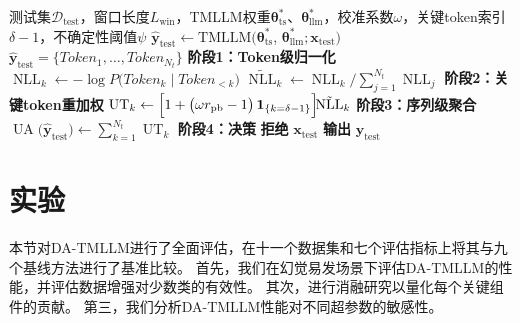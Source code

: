 \documentclass[UTF8,lettersize,journal]{IEEEtran}
\begin{document}
\begin{algorithm}[t]
	\caption{基于关键token驱动不确定性重加权策略的推理流程}
	\label{alg:inference}
	\begin{algorithmic}[1]
		\Require 测试集$\mathcal{D}_\text{test}$，窗口长度$L_{\mathrm{win}}$，TMLLM权重$\bm{\theta}_\mathrm{ts}^*$、$\bm{\theta}_\mathrm{llm}^*$，校准系数$\omega$，关键token索引$\delta-1$，不确定性阈值$\psi$
		\State $\hat{\bm{y}}_\mathrm{test} \gets \mathrm{TMLLM}(\bm{\theta}_\mathrm{ts}^*$, $\bm{\theta}_\mathrm{llm}^*;\bm{x}_\mathrm{test})$
		\State $\hat{\bm{y}}_\mathrm{test}=\{\mathit{Token}_1,\dots,\mathit{Token}_{N_t}\}$
		\Statex \textbf{阶段1：Token级归一化}
		\State $\operatorname{NLL}_k \gets -\!\log P\!\bigl(\mathit{Token}_k \mid \mathit{Token}_{<k}\bigr)$
		\EndFor
		\State $\displaystyle
		\tilde{\operatorname{NLL}}_k \gets 
		\operatorname{NLL}_k \Big/ \sum_{j=1}^{N_t}\operatorname{NLL}_j$
		\Statex \textbf{阶段2：关键token重加权}
		\State $\displaystyle
		\operatorname{UT}_k \gets
		\Bigl[1 + \bigl(\omega r_{\mathrm{pb}} - 1\bigr)\,
		\mathbf{1}_{\{k=\delta-1\}}\Bigr]\!
		\tilde{\operatorname{NLL}}_k$
		\EndFor
		\Statex \textbf{阶段3：序列级聚合}
		\State $\displaystyle
		\operatorname{UA}\!\bigl(\hat{\bm{y}}_\mathrm{test}\bigr) \gets
		\sum_{k=1}^{N_t}\operatorname{UT}_k$
		\Statex \textbf{阶段4：决策}
		\State \textbf{拒绝} $\bm{x}_\mathrm{test}$ 
		\Else
		\State \textbf{输出} $\hat{\bm{y}}_\mathrm{test}$
		\EndIf
		\EndFor
	\end{algorithmic}
\end{algorithm}
%

\section{实验}
本节对DA-TMLLM进行了全面评估，在十一个数据集和七个评估指标上将其与九个基线方法进行了基准比较。
首先，我们在幻觉易发场景下评估DA-TMLLM的性能，并评估数据增强对少数类的有效性。
其次，进行消融研究以量化每个关键组件的贡献。
第三，我们分析DA-TMLLM性能对不同超参数的敏感性。
\end{document}
